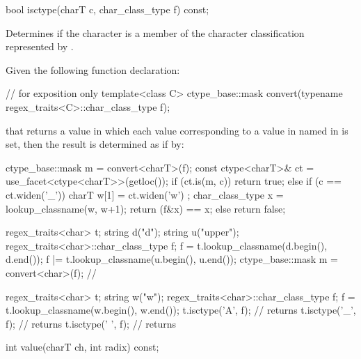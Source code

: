 %
\begin{itemdecl}
bool isctype(charT c, char_class_type f) const;
\end{itemdecl}

\begin{itemdescr}
\pnum
\effects
Determines if the character  is a member of the character
classification represented by .

\pnum
\returns
Given the following function declaration:
\begin{codeblock}
// for exposition only
template<class C>
  ctype_base::mask convert(typename regex_traits<C>::char_class_type f);
\end{codeblock}
that returns a value in which each  value corresponding to
a value in  named in  is set, then the
result is determined as if by:
\begin{codeblock}
ctype_base::mask m = convert<charT>(f);
const ctype<charT>& ct = use_facet<ctype<charT>>(getloc());
if (ct.is(m, c)) {
  return true;
} else if (c == ct.widen('_')) {
  charT w[1] = { ct.widen('w') };
  char_class_type x = lookup_classname(w, w+1);
  return (f&x) == x;
} else {
  return false;
}
\end{codeblock}
\begin{example}
\begin{codeblock}
regex_traits<char> t;
string d("d");
string u("upper");
regex_traits<char>::char_class_type f;
f = t.lookup_classname(d.begin(), d.end());
f |= t.lookup_classname(u.begin(), u.end());
ctype_base::mask m = convert<char>(f);  // 
\end{codeblock}
\end{example}
\begin{example}
\begin{codeblock}
regex_traits<char> t;
string w("w");
regex_traits<char>::char_class_type f;
f = t.lookup_classname(w.begin(), w.end());
t.isctype('A', f);  // returns 
t.isctype('_', f);  // returns 
t.isctype(' ', f);  // returns 
\end{codeblock}
\end{example}
\end{itemdescr}

%
\begin{itemdecl}
int value(charT ch, int radix) const;
\end{itemdecl}

